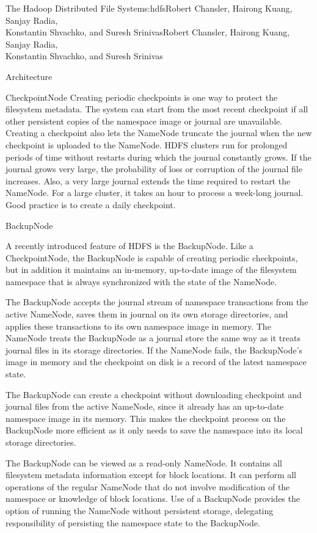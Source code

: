 \begin{aosachaptertoc}{The Hadoop Distributed File System}{s:hdfs}{Robert Chansler, Hairong Kuang, Sanjay Radia, \\ Konstantin Shvachko, and Suresh Srinivas}{Robert Chansler, Hairong Kuang, Sanjay Radia, \\ \hspace*{0.9cm} Konstantin Shvachko, and Suresh Srinivas}
\begin{aosasect1}{Architecture}
\begin{aosasect2}{CheckpointNode}
Creating periodic checkpoints is one way to protect the filesystem
metadata. The system can start from the most recent checkpoint if all
other persistent copies of the namespace image or journal are
unavailable. Creating a checkpoint also lets the NameNode truncate the
journal when the new checkpoint is uploaded to the NameNode.  HDFS
clusters run for prolonged periods of time without restarts during
which the journal constantly grows. If the journal grows very large,
the probability of loss or corruption of the journal file
increases. Also, a very large journal extends the time required to
restart the NameNode. For a large cluster, it takes an hour to process
a week-long journal. Good practice is to create a daily checkpoint.

\end{aosasect2}

\begin{aosasect2}{BackupNode}

A recently introduced feature of HDFS is the BackupNode. Like a
CheckpointNode, the BackupNode is capable of creating periodic
checkpoints, but in addition it maintains an in-memory, up-to-date
image of the filesystem namespace that is always synchronized with
the state of the NameNode.

The BackupNode accepts the journal stream of namespace transactions
from the active NameNode, saves them in journal on its own storage
directories, and applies these transactions to its own namespace image
in memory. The NameNode treats the BackupNode as a journal store the
same way as it treats journal files in its storage directories. If the
NameNode fails, the BackupNode's image in memory and the checkpoint on
disk is a record of the latest namespace state.

The BackupNode can create a checkpoint without downloading checkpoint
and journal files from the active NameNode, since it already has an
up-to-date namespace image in its memory. This makes the checkpoint
process on the BackupNode more efficient as it only needs to save the
namespace into its local storage directories.

The BackupNode can be viewed as a read-only NameNode. It contains all
filesystem metadata information except for block locations. It can
perform all operations of the regular NameNode that do not involve
modification of the namespace or knowledge of block locations. Use of
a BackupNode provides the option of running the NameNode without
persistent storage, delegating responsibility of persisting the
namespace state to the BackupNode.


\end{aosasect2}
\end{aosasect1}
\end{aosachaptertoc}
